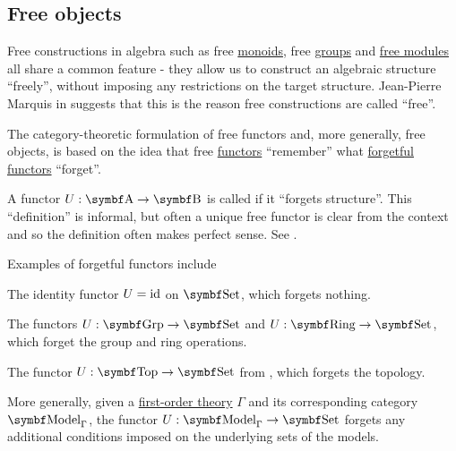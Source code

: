 \subsection{Free objects}\label{subsec:free_objects}

\begin{remark}\label{remark:free_construction_etymology}
  Free constructions in algebra such as free \hyperref[def:free_monoid]{monoids}, free \hyperref[def:free_group]{groups} and \hyperref[def:free_left_module]{free modules} all share a common feature - they allow us to construct an algebraic structure \enquote{freely}, without imposing any restrictions on the target structure. Jean-Pierre Marquis in \cite{StanfordPlato:category_theory} suggests that this is the reason free constructions are called \enquote{free}.

  The category-theoretic formulation of free functors and, more generally, free objects, is based on the idea that free \hyperref[def:free_functor]{functors} \enquote{remember} what \hyperref[def:forgetful_functor]{forgetful functors} \enquote{forget}.
\end{remark}

\begin{definition}\label{def:forgetful_functor}
  A functor \( U: \Cat{A} \to \Cat{B} \) is called  if it \enquote{forgets structure}. This \enquote{definition} is informal, but often a unique free functor is clear from the context and so the definition often makes perfect sense. See .
\end{definition}

\begin{example}\label{ex:forgetful_functors}
  Examples of forgetful functors include

  \begin{DefEnum}
    \item The identity functor \( U = \operatorname{id} \) on \( \Cat{Set} \), which forgets nothing.
    \item The functors \( U: \Cat{Grp} \to \Cat{Set} \) and \( U: \Cat{Ring} \to \Cat{Set} \), which forget the group and ring operations.
    \item The functor \( U: \Cat{Top} \to \Cat{Set} \) from , which forgets the topology.
    \item More generally, given a \hyperref[def:first_order_theory]{first-order theory} \( \Gamma \) and its corresponding category \( \Cat{Model}_\Gamma \), the functor \( U: \Cat{Model}_\Gamma \to \Cat{Set} \) forgets any additional conditions imposed on the underlying sets of the models.
  \end{DefEnum}
\end{example}

